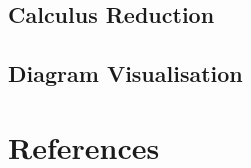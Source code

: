 \documentclass{article}
\begin{document}
    \subsection{Calculus Reduction}


    \subsection{Diagram Visualisation}
        \cite{learning-styles}



\section{References}

    



\end{document}
